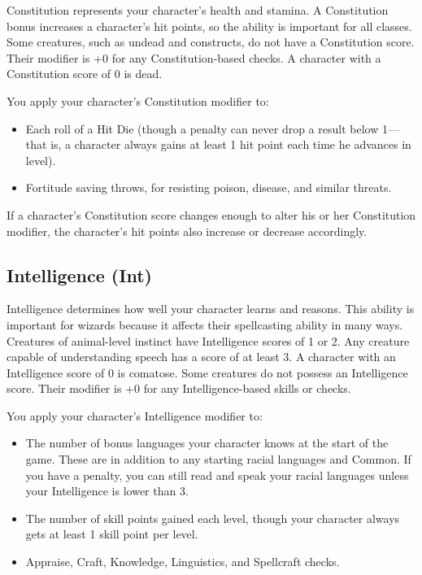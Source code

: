 				
Constitution represents your character's health and stamina. A Constitution bonus increases a character's hit points, so the ability is important for all classes. Some creatures, such as undead and constructs, do not have a Constitution score. Their modifier is +0 for any Constitution-based checks. A character with a Constitution score of 0 is dead. 
				
You apply your character's Constitution modifier to:
				\begin{itemize}\item  Each roll of a Hit Die (though a penalty can never drop a result below 1---that is, a character always gains at least 1 hit point each time he advances in level).
				\item  Fortitude saving throws, for resisting poison, disease, and similar threats.
\end{itemize}
				
If a character's Constitution score changes enough to alter his or her Constitution modifier, the character's hit points also increase or decrease accordingly.
				
\subsection{Intelligence (Int)}

				
Intelligence determines how well your character learns and reasons. This ability is important for wizards because it affects their spellcasting ability in many ways. Creatures of animal-level instinct have Intelligence scores of 1 or 2. Any creature capable of understanding speech has a score of at least 3. A character with an Intelligence score of 0 is comatose. Some creatures do not possess an Intelligence score. Their modifier is +0 for any Intelligence-based skills or checks.
				
You apply your character's Intelligence modifier to:
				\begin{itemize}\item  The number of bonus languages your character knows at the start of the game. These are in addition to any starting racial languages and Common. If you have a penalty, you can still read and speak your racial languages unless your Intelligence is lower than 3.
				\item  The number of skill points gained each level, though your character always gets at least 1 skill point per level.
				\item  Appraise, Craft, Knowledge, Linguistics, and Spellcraft checks.
\end{itemize}
				
